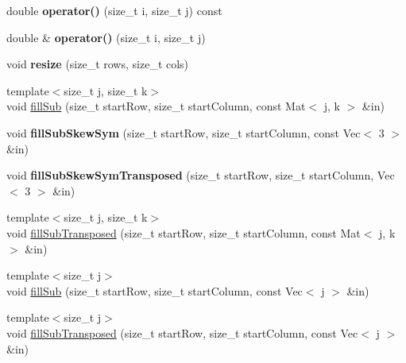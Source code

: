 \begin{DoxyCompactItemize}
double {\bfseries operator()} (size\+\_\+t i, size\+\_\+t j) const
\item 
\mbox{\label{classraisim_1_1MatDyn_ae12a1ea871070ec73acaabbf9ece5b26}} 
double \& {\bfseries operator()} (size\+\_\+t i, size\+\_\+t j)
\item 
\mbox{\label{classraisim_1_1MatDyn_a98afb51ef339fde4cb0dfdc154cb69e8}} 
void {\bfseries resize} (size\+\_\+t rows, size\+\_\+t cols)
\item 
{\footnotesize template$<$size\+\_\+t j, size\+\_\+t k$>$ }\\void \hyperlink{classraisim_1_1MatDyn_a1dc88bef6db9b8e02b9bda77a5403d80}{fill\+Sub} (size\+\_\+t start\+Row, size\+\_\+t start\+Column, const Mat$<$ j, k $>$ \&in)
\item 
\mbox{\label{classraisim_1_1MatDyn_ab0f505b108d5762efe99b36c233dd352}} 
void {\bfseries fill\+Sub\+Skew\+Sym} (size\+\_\+t start\+Row, size\+\_\+t start\+Column, const Vec$<$ 3 $>$ \&in)
\item 
\mbox{\label{classraisim_1_1MatDyn_a86e59006acd807f20ac287a7bb03a572}} 
void {\bfseries fill\+Sub\+Skew\+Sym\+Transposed} (size\+\_\+t start\+Row, size\+\_\+t start\+Column, Vec$<$ 3 $>$ \&in)
\item 
{\footnotesize template$<$size\+\_\+t j, size\+\_\+t k$>$ }\\void \hyperlink{classraisim_1_1MatDyn_a4bcc7fd38fa50cfb3dad05f91a5f4540}{fill\+Sub\+Transposed} (size\+\_\+t start\+Row, size\+\_\+t start\+Column, const Mat$<$ j, k $>$ \&in)
\item 
{\footnotesize template$<$size\+\_\+t j$>$ }\\void \hyperlink{classraisim_1_1MatDyn_a09fbfebf894fb204d71227e8662d0f9c}{fill\+Sub} (size\+\_\+t start\+Row, size\+\_\+t start\+Column, const Vec$<$ j $>$ \&in)
\item 
{\footnotesize template$<$size\+\_\+t j$>$ }\\void \hyperlink{classraisim_1_1MatDyn_af51f76085457af3e3a3671d95945b493}{fill\+Sub\+Transposed} (size\+\_\+t start\+Row, size\+\_\+t start\+Column, const Vec$<$ j $>$ \&in)
\item 
\mbox{\label{classraisim_1_1MatDyn_ac08095d31bed4af1d6235187c3727f1c}} 

\end{DoxyCompactItemize}
